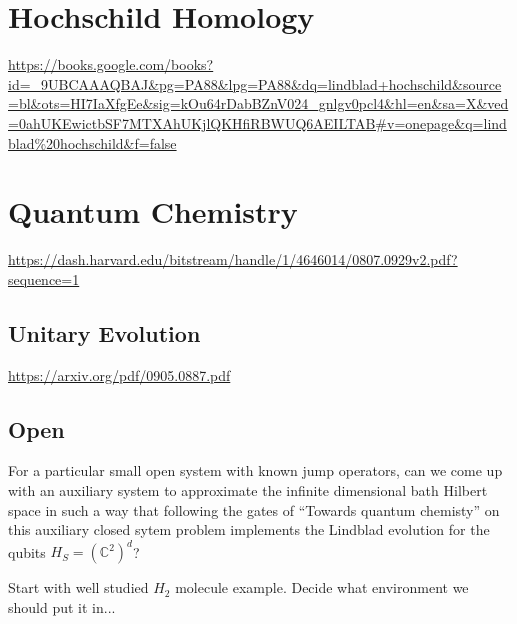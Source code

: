 \documentclass[11pt]{article}
\theoremstyle{change}
\theoremstyle{nonumberplain}
\numberwithin{equation}{section}
\begin{document}
\section{Hochschild Homology}

\url{https://books.google.com/books?id=_9UBCAAAQBAJ&pg=PA88&lpg=PA88&dq=lindblad+hochschild&source=bl&ots=HI7IaXfgEe&sig=kOu64rDabBZnV024_gnlgv0pcl4&hl=en&sa=X&ved=0ahUKEwictbSF7MTXAhUKjlQKHfiRBWUQ6AEILTAB#v=onepage&q=lindblad\%20hochschild&f=false}

\section{Quantum Chemistry}

\url{https://dash.harvard.edu/bitstream/handle/1/4646014/0807.0929v2.pdf?sequence=1}

\subsection{Unitary Evolution}

\url{https://arxiv.org/pdf/0905.0887.pdf}

\subsection{Open}

For a particular small open system with known jump operators, can we come up with an auxiliary system to approximate the infinite dimensional bath Hilbert space in such a way that following the gates of ``Towards quantum chemisty'' on this auxiliary closed sytem problem implements the Lindblad evolution for the qubits $H_S = (\mathbb{C}^2)^d$?

Start with well studied $H_2$ molecule example. Decide what environment we should put it in...
\end{document}
